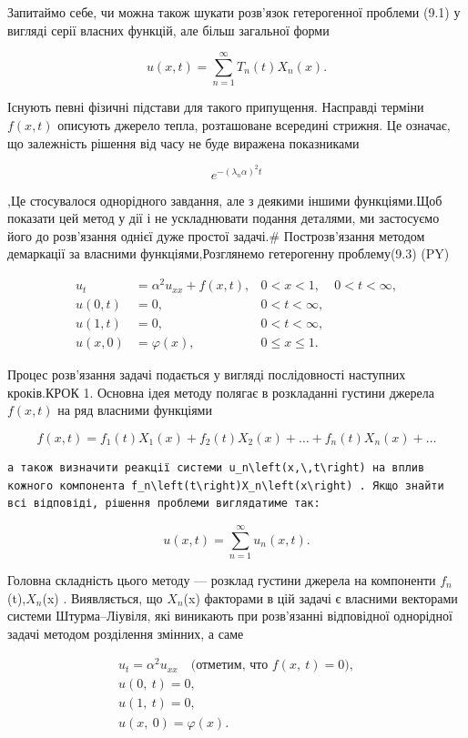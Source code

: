 \documentclass[
  ukrainian,
]{article}
\begin{document}
Запитаймо себе, чи можна також шукати розв'язок гетерогенної проблеми
(9.1) у вигляді серії власних функцій, але більш загальної форми

\[
u(x, t) = \sum_{n=1}^{\infty} T_n(t) X_n(x).
\]

Існують певні фізичні підстави для такого припущення. Насправді терміни
\(f(x,t)\) описують джерело тепла, розташоване всередині стрижня. Це
означає, що залежність рішення від часу не буде виражена показниками

\[
e^{-(\lambda_n\alpha)^2 t}
\]

,Це стосувалося однорідного завдання, але з деякими іншими функціями.Щоб
показати цей метод у дії і не ускладнювати подання деталями, ми
застосуємо його до розв'язання однієї дуже простої задачі.\#
Построзв'язання методом демаркації за власними функціями,Розглянемо
гетерогенну проблему(9.3) (PY)

\[
\begin{aligned} u_t &= \alpha^2 u_{xx} + f(x, t), & 0 < x < 1, & 0 < t < \infty, \\ u(0, t) &= 0, & 0 < t < \infty, \\ u(1, t) &= 0, & 0 < t < \infty, \\ u(x, 0) &= \varphi(x), & 0 \leqslant x \leqslant 1. \end{aligned}
\]

Процес розв'язання задачі подається у вигляді послідовності наступних
кроків.КРОК 1. Основна ідея методу полягає в розкладанні густини джерела
\(f(x, t)\) на ряд власними функціями

\[
f(x, t) = f_1(t) X_1(x) + f_2(t) X_2(x) + \dots + f_n(t) X_n(x) + \dots
\]

\begin{verbatim}
а також визначити реакції системи u_n\left(x,\,t\right) на вплив кожного компонента f_n\left(t\right)X_n\left(x\right) . Якщо знайти всі відповіді, рішення проблеми виглядатиме так:
\end{verbatim}

\[
u(x, t) = \sum_{n=1}^{\infty} u_n(x, t).
\]

Головна складність цього методу --- розклад густини джерела на
компоненти \(f_n\)(t),\(X_n\)(x) . Виявляється, що \(X_n\)(x) факторами
в цій задачі є власними векторами системи Штурма--Ліувіля, які виникають
при розв'язанні відповідної однорідної задачі методом розділення
змінних, а саме

\[
\begin{array}{c} u_t = \alpha^2 u_{xx} \quad \text{(отметим, что } f(x, \ t) = 0), \\ u(0, \ t) = 0, \\ u(1, \ t) = 0, \\ u(x, \ 0) = \varphi(x). \end{array}
\]
\end{document}
